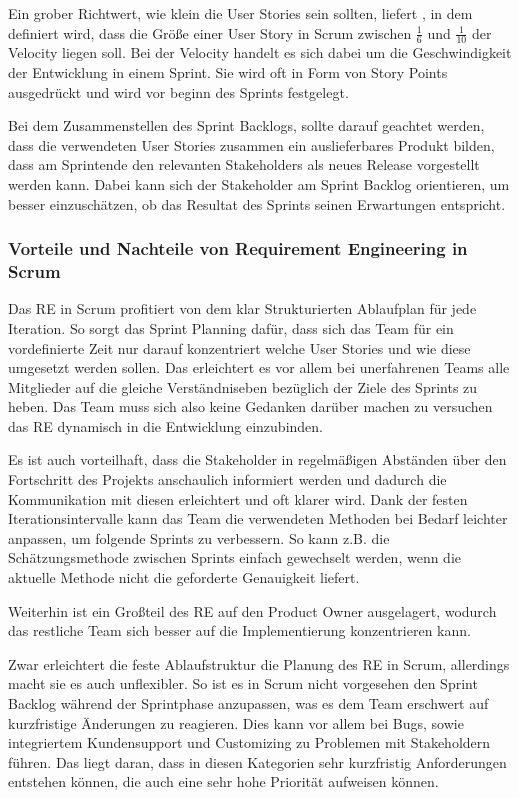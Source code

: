\documentclass[acmtog]{acmart}
\begin{document}
Ein grober Richtwert, wie klein die User Stories sein sollten, liefert \cite{humanizingwork}, 
in dem definiert wird, dass die Größe einer User Story in Scrum zwischen \( \frac{1}{6} \) und \( \frac{1}{10} \) der Velocity liegen soll. Bei der Velocity handelt 
es sich dabei um die Geschwindigkeit der Entwicklung in einem Sprint. Sie wird oft in Form von Story Points ausgedrückt und wird vor 
beginn des Sprints festgelegt. \cite{humanizingwork}

Bei dem Zusammenstellen des Sprint Backlogs, sollte darauf geachtet werden, dass die verwendeten User Stories zusammen ein auslieferbares 
Produkt bilden, dass am Sprintende den relevanten Stakeholders als neues Release vorgestellt werden kann. Dabei kann sich der Stakeholder 
am Sprint Backlog orientieren, um besser einzuschätzen, ob das Resultat des Sprints seinen Erwartungen entspricht. \cite{reinscrum}

\subsubsection{Vorteile und Nachteile von Requirement Engineering in Scrum}

Das RE in Scrum profitiert von dem klar Strukturierten Ablaufplan für jede Iteration. So sorgt das Sprint Planning dafür, dass sich das 
Team für ein vordefinierte Zeit nur darauf konzentriert welche User Stories  und wie diese umgesetzt werden sollen. Das erleichtert es vor 
allem bei unerfahrenen Teams alle Mitglieder auf die gleiche Verständniseben bezüglich der Ziele des Sprints zu heben. Das Team muss sich 
also keine Gedanken darüber machen zu versuchen das RE dynamisch in die Entwicklung einzubinden.

Es ist auch vorteilhaft, dass die Stakeholder in regelmäßigen Abständen über den Fortschritt des Projekts anschaulich informiert werden und 
dadurch die Kommunikation mit diesen erleichtert und oft klarer wird. Dank der festen Iterationsintervalle kann das Team die verwendeten 
Methoden bei Bedarf leichter anpassen, um folgende Sprints zu verbessern. So kann z.B. die Schätzungsmethode zwischen Sprints einfach gewechselt 
werden, wenn die aktuelle Methode nicht die geforderte Genauigkeit liefert.

Weiterhin ist ein Großteil des RE auf den Product Owner ausgelagert, wodurch das restliche Team sich besser auf die Implementierung konzentrieren kann.

Zwar erleichtert die feste Ablaufstruktur die Planung des RE in Scrum, allerdings macht sie es auch unflexibler. So ist es in Scrum nicht 
vorgesehen den Sprint Backlog während der Sprintphase anzupassen, was es dem Team erschwert auf kurzfristige Änderungen zu reagieren. Dies 
kann vor allem bei Bugs, sowie integriertem Kundensupport und Customizing zu Problemen mit Stakeholdern führen. Das liegt daran, dass in 
diesen Kategorien sehr kurzfristig Anforderungen entstehen können, die auch eine sehr hohe Priorität aufweisen können.
\end{document}
